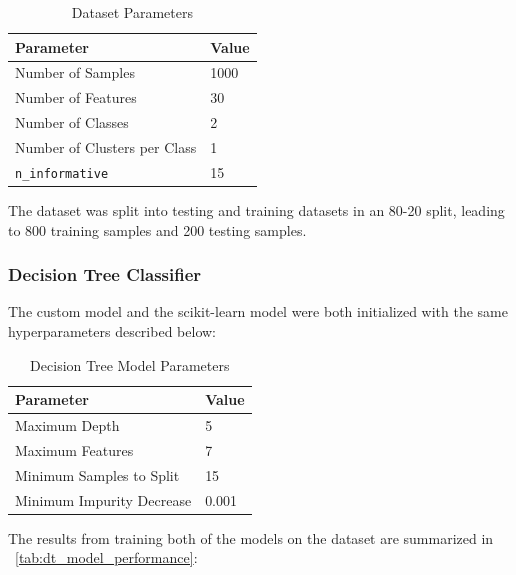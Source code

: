 \begin{table}[H]
  \centering
  \begin{tabularx}{0.65\textwidth}{X|X}
    \toprule
    \textbf{Parameter}           & \textbf{Value} \\
    \midrule
    Number of Samples            & 1000           \\
    Number of Features           & 30             \\
    Number of Classes            & 2              \\
    Number of Clusters per Class & 1              \\
    \texttt{n\_informative}      & 15             \\
    \bottomrule
  \end{tabularx}
  \caption{Dataset Parameters}
  \label{tab:dataset_params}
\end{table}
\FloatBarrier

The dataset was split into testing and training datasets in an 80-20 split, leading to 800 training samples and 200 testing samples.

\subsubsection{Decision Tree Classifier}

The custom model and the scikit-learn model were both initialized with the same hyperparameters described below:

\begin{table}[h!]
  \centering
  \begin{tabularx}{0.65\textwidth}{X|X}
    \toprule
    \textbf{Parameter}        & \textbf{Value} \\
    \midrule
    Maximum Depth             & 5              \\
    Maximum Features          & 7              \\
    Minimum Samples to Split  & 15             \\
    Minimum Impurity Decrease & 0.001          \\
    \bottomrule
  \end{tabularx}
  \caption{Decision Tree Model Parameters}
  \label{tab:dt_modelparams}
\end{table}

The results from training both of the models on the dataset are summarized in ~\autoref{tab:dt_model_performance}:

